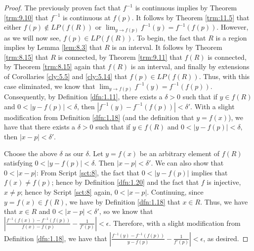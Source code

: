 \documentclass[../main.tex]{subfiles}
\begin{document}
\begin{theorem}
\begin{proof}
        The previously proven fact that $f^{-1}$ is continuous implies by Theorem \ref{trm:9.10} that $f^{-1}$ is continuous at $f(p)$. It follows by Theorem \ref{trm:11.5} that either $f(p)\notin LP(f(R))$ or $\lim_{y\to f(p)}f^{-1}(y)=f^{-1}(f(p))$. However, as we will now see, $f(p)\in LP(f(R))$. To begin, the fact that $R$ is a region implies by Lemma \ref{lem:8.3} that $R$ is an interval. It follows by Theorem \ref{trm:8.15} that $R$ is connected, by Theorem \ref{trm:9.11} that $f(R)$ is connected, by Theorem \ref{trm:8.15} again that $f(R)$ is an interval, and finally by extensions of Corollaries \ref{cly:5.5} and \ref{cly:5.14} that $f(p)\in LP(f(R))$. Thus, with this case eliminated, we know that $\lim_{y\to f(p)}f^{-1}(y)=f^{-1}(f(p))$. Consequently, by Definition \ref{dfn:1.11}, there exists a $\delta>0$ such that if $y\in f(R)$ and $0<|y-f(p)|<\delta$, then $|f^{-1}(y)-f^{-1}(f(p))|<\delta'$. With a slight modification from Definition \ref{dfn:1.18} (and the definition that $y=f(x)$), we have that there exists a $\delta>0$ such that if $y\in f(R)$ and $0<|y-f(p)|<\delta$, then $|x-p|<\delta'$.\par
        Choose the above $\delta$ as our $\delta$. Let $y=f(x)$ be an arbitrary element of $f(R)$ satisfying $0<|y-f(p)|<\delta$. Then $|x-p|<\delta'$. We can also show that $0<|x-p|$: From Script \ref{sct:8}, the fact that $0<|y-f(p)|$ implies that $f(x)\neq f(p)$; hence by Definition \ref{dfn:1.20} and the fact that $f$ is injective, $x\neq p$; hence by Script \ref{sct:8} again, $0<|x-p|$. Continuing, since $y=f(x)\in f(R)$, we have by Definition \ref{dfn:1.18} that $x\in R$. Thus, we have that $x\in R$ and $0<|x-p|<\delta'$, so we know that $|\frac{f^{-1}(f(x))-f^{-1}(f(p))}{f(x)-f(p)}-\frac{1}{f'(p)}|<\epsilon$. Therefore, with a slight modification from Definition \ref{dfn:1.18}, we have that $|\frac{f^{-1}(y)-f^{-1}(f(p))}{y-f(p)}-\frac{1}{f'(p)}|<\epsilon$, as desired.
    \end{proof}
\end{theorem}
\end{document}
